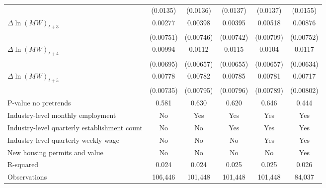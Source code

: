 {\begin{tabular}{l*{5}{c}}
          & (0.0135)         & (0.0136)         & (0.0137)         & (0.0137)         & (0.0155)         \\
[1em]
$\Delta \ln(MW)_{t+3}$&  0.00277         &  0.00398         &  0.00395         &  0.00518         &  0.00876         \\
          &(0.00751)         &(0.00746)         &(0.00742)         &(0.00709)         &(0.00752)         \\
[1em]
$\Delta \ln(MW)_{t+4}$&  0.00994         &   0.0112\sym{*}  &   0.0115\sym{*}  &   0.0104         &   0.0117\sym{*}  \\
          &(0.00695)         &(0.00657)         &(0.00655)         &(0.00657)         &(0.00634)         \\
[1em]
$\Delta \ln(MW)_{t+5}$&  0.00778         &  0.00782         &  0.00785         &  0.00781         &  0.00717         \\
          &(0.00735)         &(0.00795)         &(0.00796)         &(0.00789)         &(0.00802)         \\
\hline
P-value no pretrends&    0.581         &    0.630         &    0.620         &    0.646         &    0.444         \\
Industry-level monthly employment&       No         &      Yes         &      Yes         &      Yes         &      Yes         \\
Industry-level quarterly establishment count&       No         &       No         &      Yes         &      Yes         &      Yes         \\
Industry-level quarterly weekly wage&       No         &       No         &       No         &      Yes         &      Yes         \\
New housing permits and value&       No         &       No         &       No         &       No         &      Yes         \\
R-squared &    0.024         &    0.024         &    0.025         &    0.025         &    0.026         \\
Observations&  106,446         &  101,448         &  101,448         &  101,448         &   84,037         \\
\hline\hline
\end{tabular}
}
